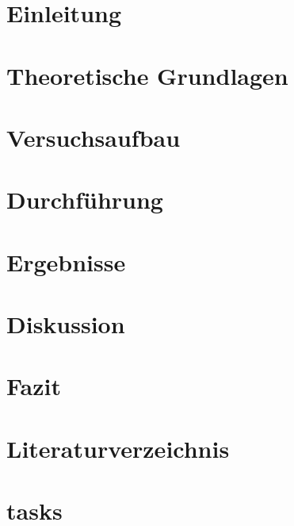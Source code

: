 \documentclass[a4paper, 11pt, oneside]{Thesis}  %
\begin{document}




\renewcommand{\contentsname}{Inhaltsverzeichnis}
\tableofcontents
\newpage

\chapter{Einleitung}


\chapter{Theoretische Grundlagen}



\chapter{Versuchsaufbau}


\chapter{Durchführung}


\chapter{Ergebnisse}


\chapter{Diskussion}


\chapter{Fazit}


\chapter{Literaturverzeichnis}


\chapter{tasks}

\end{document}
